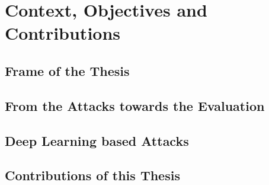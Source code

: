 \chapter{Context, Objectives and Contributions}
\minitoc
\newpage
\section{Frame of the Thesis}
	

\section{From the Attacks towards the Evaluation}
	

\section{Deep Learning based Attacks}
	\label{sec:dl_sca}
	

\section{Contributions of this Thesis}
	